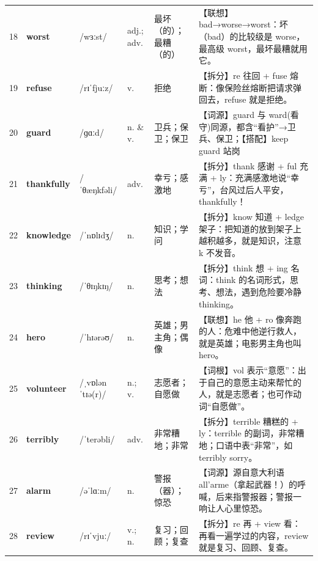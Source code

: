 \documentclass[UTF8,a4paper,11pt,oneside]{ctexbook}
\newcommand{\cellword}[1]{{\bfseries\textcolor{wordcol}{#1}}}
\newcommand{\cellipa}[1]{{\footnotesize\textcolor{ipacol}{#1}}}
\newcommand{\cellpos}[1]{\textcolor{poscol}{#1}}
\newcommand{\cellno}[1]{\textcolor{volcolor!75!black}{#1}}
\begin{document}
{\begin{longtable}{@{}C{0.045\textwidth}L{0.155\textwidth}L{0.175\textwidth}C{0.070\textwidth}L{0.180\textwidth}L{0.282\textwidth}@{}}
\cellno{18} & \cellword{worst} & \cellipa{/wɜːst/} & \cellpos{adj.;\allowbreak{} adv.} & 最坏（的）；最糟（的） & \textcolor{tagAssoc}{【联想】}bad→\allowbreak{}worse→\allowbreak{}worst：坏（bad）的比较级是 worse，最高级 worst，最坏最糟就用它。 \\
 \cellno{19} & \cellword{refuse} & \cellipa{/rɪˈfjuːz/} & \cellpos{v.} & 拒绝 & \textcolor{tagSplit}{【拆分】}re 往回 + fuse 熔断：像保险丝熔断把请求弹回去，refuse 就是拒绝。 \\
\cellno{20} & \cellword{guard} & \cellipa{/ɡɑːd/} & \cellpos{n.  \& v.} & 卫兵；保卫；保卫 & \textcolor{tagEtym}{【词源】}guard 与 ward(看守)同源，都含“看护”→\allowbreak{}卫兵、保卫；\textcolor{tagColloc}{【搭配】}keep guard 站岗 \\
 \cellno{21} & \cellword{thankfully} & \cellipa{/ˈθæŋkfəli/} & \cellpos{adv.} & 幸亏；感激地 & \textcolor{tagSplit}{【拆分】}thank 感谢 + ful 充满 + ly：充满感激地说“幸亏”，台风过后人平安，thankfully！ \\
\cellno{22} & \cellword{knowledge} & \cellipa{/ˈnɒlɪdʒ/} & \cellpos{n.} & 知识；学问 & \textcolor{tagSplit}{【拆分】}know 知道 + ledge 架子：把知道的放到架子上越积越多，就是知识，注意 k 不发音。 \\
 \cellno{23} & \cellword{thinking} & \cellipa{/ˈθɪŋkɪŋ/} & \cellpos{n.} & 思考；想法 & \textcolor{tagSplit}{【拆分】}think 想 + ing 名词：think 的名词形式，思考、想法，遇到危险要冷静 thinking。 \\
\cellno{24} & \cellword{hero} & \cellipa{/ˈhɪərəʊ/} & \cellpos{n.} & 英雄；男主角；偶像 & \textcolor{tagAssoc}{【联想】}he 他 + ro 像奔跑的人：危难中他逆行救人，就是英雄；电影男主角也叫 hero。 \\
 \cellno{25} & \cellword{volunteer} & \cellipa{/ˌvɒlənˈtɪə(r)/} & \cellpos{n.;\allowbreak{} v.} & 志愿者；自愿做 & \textcolor{tagRoot}{【词根】}vol 表示“意愿”：出于自己的意愿主动来帮忙的人，就是志愿者；也可作动词“自愿做”。 \\
\cellno{26} & \cellword{terribly} & \cellipa{/ˈterəbli/} & \cellpos{adv.} & 非常糟地；非常 & \textcolor{tagSplit}{【拆分】}terrible 糟糕的 + ly：terrible 的副词，非常糟地；口语中表“非常”，如 terribly sorry。 \\
 \cellno{27} & \cellword{alarm} & \cellipa{/əˈlɑːm/} & \cellpos{n.} & 警报（器）；惊恐 & \textcolor{tagEtym}{【词源】}源自意大利语 all'arme（拿起武器！）的呼喊，后来指警报器；警报一响让人心里惊恐。 \\
\cellno{28} & \cellword{review} & \cellipa{/rɪˈvjuː/} & \cellpos{v.;\allowbreak{} n.} & 复习；回顾；复查 & \textcolor{tagSplit}{【拆分】}re 再 + view 看：再看一遍学过的内容，review 就是复习、回顾、复查。 \\

\end{longtable}}
\end{document}
